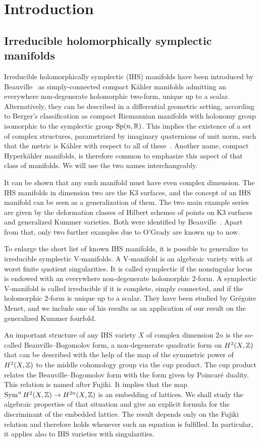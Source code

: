 
\section{Introduction}
\subsection{Irreducible holomorphically symplectic manifolds}
Irreducible holomorphically symplectic (IHS) manifolds have been introduced by Beauville~\cite{Beauville} as simply-connected compact K\"ahler manifolds admitting an everywhere non-degenerate holomorphic two-form, unique up to a scalar. 
Alternatively, they can be described in a differential geometric setting, according to Berger's classification as compact Riemannian manifolds with holonomy group isomorphic to the symplectic group $\operatorname{Sp}(n,\mathbb{R})$. This implies the existence of a set of complex structures, parametrized by imaginary quaternions of unit norm, such that the metric is K\"ahler with respect to all of these~\cite[Sect.~23]{Huybrechts}. 
Another name, compact Hyperk\"ahler manifolds, is therefore common to emphasize this aspect of that class of manifolds. We will use the two names interchangeably.

It can be shown that any such manifold must have even complex dimension. The IHS manifolds in dimension two are the K3 surfaces, and the concept of an IHS manifold can be seen as a generalization of them. The two main example series are given by the deformation classes of Hilbert schemes of points on K3 surfaces and generalized Kummer varieties. Both were identified by Beauville~\cite{Beauville}. Apart from that, only two further examples due to O'Grady are known up to now.

To enlarge the short list of known IHS manifolds, it is possible to generalize to irreducible symplectic V-manifolds. A V-manifold is an algebraic variety with at worst finite quotient singularities. It is called symplectic if the nonsingular locus is endowed with an everywhere non-degenerate holomorphic 2-form. 
A symplectic V-manifold is called irreducible if it is complete, simply connected, and if the holomorphic 2-form is unique up to a scalar. They have been studied by Gr\'egoire Menet, and we include one of his results as an application of our result on the generalized Kummer fourfold.

An important structure of any IHS variety $X$ of complex dimension $2n$ is the so-called Beauville--Bogomolov form, a non-degenerate quadratic form on $H^2(X,\mathbb{Z})$ that can be described with the help of the map of the symmetric power of $H^2(X,\mathbb{Z})$ to the middle cohomology group via the cup product. The cup product relates the Beauville--Bogomolov form with the form given by Poincar\'e duality. This relation is named after Fujiki. It implies that the map $\operatorname{Sym}^n H^2(X,\mathbb{Z})\rightarrow H^{2n}(X,\mathbb{Z})$ is an embedding of lattices. We shall study the algebraic properties of that situation and give an explicit formula for the discriminant of the embedded lattice. The result depends only on the Fujiki relation and therefore holds whenever such an equation is fulfilled. In particular, it applies also to IHS varieties with singularities.

